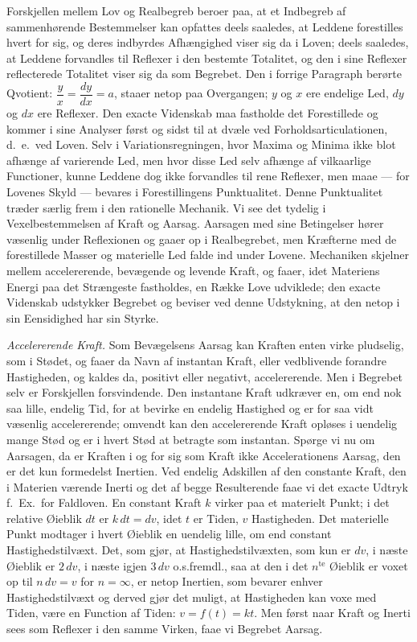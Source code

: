 \documentclass[12pt]{book}
\newcommand{\apage}[1]{\marginnote{\footnotesize\textit{[#1]}}}
\begin{document}
Forskjellen mellem Lov og Realbegreb beroer paa, at et Indbegreb af
sammenhørende Bestemmelser kan opfattes deels saaledes, at Leddene
forestilles hvert for sig, og deres indbyrdes Afhængighed viser sig da i
Loven; deels saaledes, at Leddene forvandles til Reflexer i den bestemte
Totalitet, og den i sine Reflexer reflecterede Totalitet viser sig da som
Begrebet. Den i forrige Paragraph berørte Qvotient: $\dfrac{y}{x} =
\dfrac{dy}{dx} = a$, staaer netop paa Overgangen; $y$ og $x$ ere endelige
Led, $dy$ og $dx$ ere Reflexer. Den exacte Videnskab maa fastholde det
Forestillede og kommer i sine Analyser først og sidst til at dvæle ved
Forholdsarticulationen, d.\ e.\ ved Loven. Selv i Variationsregningen, hvor
Maxima \apage{128} og Minima ikke blot afhænge af varierende Led, men hvor disse Led
selv afhænge af vilkaarlige Functioner, kunne Leddene dog ikke forvandles
til rene Reflexer, men maae --- for Lovenes Skyld --- bevares i Forestillingens
Punktualitet. Denne Punktualitet træder særlig frem i den rationelle
Mechanik. Vi see det tydelig i Vexelbestemmelsen af Kraft og Aarsag. Aarsagen med
sine Betingelser hører væsenlig under Reflexionen og gaaer op i
Realbegrebet, men Kræfterne med de forestillede Masser og materielle Led
falde ind under Lovene. Mechaniken skjelner mellem accelererende,
bevægende og levende Kraft, og faaer, idet Materiens Energi paa det
Strængeste fastholdes, en Række Love udviklede; den exacte Videnskab
udstykker Begrebet og beviser ved denne Udstykning, at den netop i sin
Eensidighed har sin Styrke.

\emph{Accelererende Kraft.} Som Bevægelsens Aarsag kan Kraften enten virke
pludselig, som i Stødet, og faaer da Navn af instantan Kraft, eller
vedblivende forandre Hastigheden, og kaldes da, positivt eller negativt,
accelererende. Men i Begrebet selv er Forskjellen forsvindende. Den
instantane Kraft udkræver en, om end nok saa lille, endelig Tid, for at
bevirke en endelig Hastighed og er for saa vidt væsenlig accelererende;
omvendt kan den accelererende Kraft opløses i uendelig mange Stød og er i
hvert Stød at betragte som instantan. Spørge vi nu om Aarsagen, da er
Kraften i og for sig som Kraft ikke Accelerationens Aarsag, den er det kun
formedelst Inertien. Ved endelig Adskillen af den constante Kraft, den i
Materien \apage{129} værende Inerti og det af begge Resulterende faae vi det exacte
Udtryk f.\ Ex.\ for Faldloven. En constant Kraft $k$ virker paa et
materielt Punkt; i det relative Øieblik $dt$ er $k\,dt = dv$, idet $t$ er
Tiden, $v$ Hastigheden. Det materielle Punkt modtager i hvert Øieblik en
uendelig lille, om end constant Hastighedstilvæxt. Det, som gjør, at
Hastighedstilvæxten, som kun er $dv$, i næste Øieblik er $2\,dv$, i næste
igjen $3\,dv$ o.s.fremdl., saa at den i det $n^{\mathrm{te}}$ Øieblik er voxet op til
$n\,dv = v$ for $n = \infty$, er netop Inertien, som bevarer enhver
Hastighedstilvæxt og derved gjør det muligt, at Hastigheden kan voxe med
Tiden, være en Function af Tiden: $v = f(t) = kt$. Men først naar Kraft og
Inerti sees som Reflexer i den samme Virken, faae vi Begrebet Aarsag.
\end{document}
